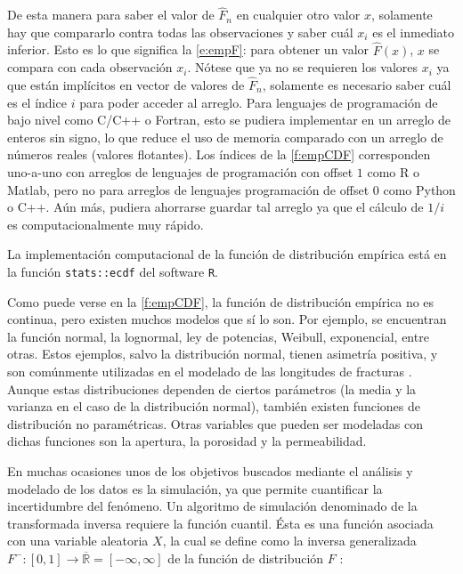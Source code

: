 De esta manera para saber el valor de $\hat{F}_n$ en cualquier otro valor $x$, solamente hay que compararlo contra todas las observaciones y saber cu\'al $x_i$ es el inmediato inferior.
Esto es lo que significa la \autoref{e:empF}: para obtener un valor $\hat{F}(x)$, $x$ se compara con cada observaci\'on $x_i$.
N\'otese que ya no se requieren los valores $x_i$ ya que est\'an impl\'icitos en vector de valores de $\hat{F}_n$, solamente es necesario saber cu\'al es el \'indice $i$ para poder acceder al arreglo.
Para lenguajes de programaci\'on de bajo nivel como C/C++ o Fortran, esto se pudiera implementar en un arreglo de enteros sin signo, lo que reduce el uso de memoria comparado con un arreglo de n\'umeros reales (valores flotantes).
Los \'indices de la \autoref{f:empCDF} corresponden uno-a-uno con arreglos de lenguajes de programaci\'on con offset $1$ como R o Matlab, pero no para arreglos de lenguajes programaci\'on de offset $0$ como Python o C++.
A\'un m\'as, pudiera ahorrarse guardar tal arreglo ya que el c\'alculo de $1/i$ es computacionalmente muy r\'apido.

La implementaci\'on computacional de la funci\'on de distribuci\'on emp\'irica est\'a en la funci\'on \verb|stats::ecdf| del software \verb|R|.

Como puede verse en la \autoref{f:empCDF}, la funci\'on de distribuci\'on emp\'irica no es continua, pero existen muchos modelos que s\'i lo son. Por ejemplo, se encuentran la funci\'on normal, la lognormal, ley de potencias, Weibull, exponencial, entre otras. Estos ejemplos, salvo la distribuci\'on normal, tienen asimetr\'ia positiva, y son com\'unmente utilizadas en el modelado de las longitudes de fracturas \citep{bonnet_scaling_2001,bour_connectivity_1997,gudmundsson_power-law_2011}. Aunque estas distribuciones dependen de ciertos par\'ametros (la media y la varianza en el caso de la distribuci\'on normal), tambi\'en existen funciones de distribuci\'on no param\'etricas. Otras variables que pueden ser modeladas con dichas funciones son la apertura, la porosidad y la permeabilidad.

En muchas ocasiones unos de los objetivos buscados mediante el an\'alisis y modelado de los datos es la simulaci\'on, ya que permite cuantificar la incertidumbre del fen\'omeno. Un algoritmo de simulaci\'on denominado de la transformada inversa requiere la funci\'on cuantil. \'Esta es una funci\'on asociada con una variable aleatoria $X$, la cual se define como la inversa generalizada $F^-:[0,1] \to \overline{\mathbb{R}}= [-\infty, \infty]$ de la funci\'on de distribuci\'on $F$ \citep{embrechts_note_2013}:

